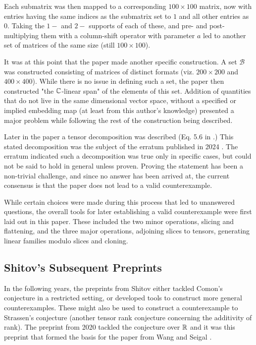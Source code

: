 \documentclass[../Lael_John_MasterThesis_Draft.tex]{subfiles}
\begin{document}
Each submatrix was then mapped to a corresponding $100 \times 100$ matrix, now with entries having the same indices as the submatrix set to $1$ and all other entries as $0$. Taking the $1-$ and $2-$ supports of each of these, and pre- and post-multiplying them with a column-shift operator with parameter $a$ led to another set of matrices of the same size (still $100 \times 100$).

It was at this point that the paper made another specific construction. A set $\mathcal{B}$ was constructed consisting of matrices of distinct formats (viz. $200 \times 200$ and $400 \times 400$). While there is no issue in defining such a set, the paper then constructed "the $\mathbb{C}$-linear span" of the elements of this set. Addition of quantities that do not live in the same dimensional vector space, without a specified or implied embedding map (at least from this author's knowledge) presented a major problem while following the rest of the construction being described.

Later in the paper a tensor decomposition was described (Eq. 5.6 in \cite{shitov_counterexample_2018}.) This stated decomposition was the subject of the erratum published in 2024 \cite{draisma_erratum_2024}. The erratum indicated such a decomposition was true only in specific cases, but could not be said to hold in general unless proven. Proving the statement has been a non-trivial challenge, and since no answer has been arrived at, the current consensus is that the paper \cite{shitov_counterexample_2018} does not lead to a valid counterexample.

 While certain choices were made during this process that led to unanswered questions, the overall tools for later establishing a valid counterexample were first laid out in this paper. These included the two minor operations, slicing and flattening, and the three major operations, adjoining slices to tensors, generating linear families modulo slices and cloning.


\subsection{Shitov's Subsequent Preprints}\label{section:shitovpreprints}

In the following years, the preprints \cites{shitov_comons_2020,shitov_higher_2024,shitov_higher_2024-1} from Shitov either tackled Comon's conjecture in a restricted setting, or developed tools to construct more general counterexamples. These might also be used to construct a counterexample to Strassen's conjecture (another tensor rank conjecture concerning the additivity of rank). The preprint from 2020 \cite{shitov_comons_2020} tackled the conjecture over $\mathbb{R}$ and it was this preprint that formed the basis for the paper from Wang and Seigal \cite{wang_lower_2023}.
\end{document}
